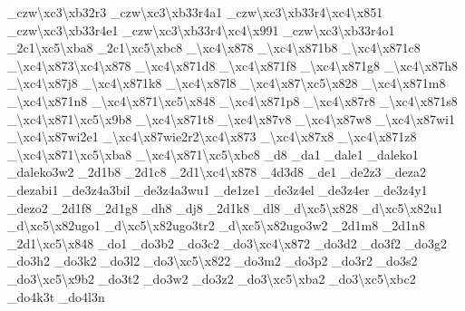 \begin{DoxyCompactItemize}
\-\_\-czw\textbackslash{}xc3\textbackslash{}xb32r3 \-\_\-czw\textbackslash{}xc3\textbackslash{}xb33r4a1 \-\_\-czw\textbackslash{}xc3\textbackslash{}xb33r4\textbackslash{}xc4\textbackslash{}x851 \-\_\-czw\textbackslash{}xc3\textbackslash{}xb33r4e1 \-\_\-czw\textbackslash{}xc3\textbackslash{}xb33r4\textbackslash{}xc4\textbackslash{}x991 \-\_\-czw\textbackslash{}xc3\textbackslash{}xb33r4o1 \-\_\-2c1\textbackslash{}xc5\textbackslash{}xba8 \-\_\-2c1\textbackslash{}xc5\textbackslash{}xbc8 \-\_\-\textbackslash{}xc4\textbackslash{}x878 \-\_\textbackslash{}xc4\textbackslash{}x871b8 \-\_\textbackslash{}xc4\textbackslash{}x871c8 \-\_\textbackslash{}xc4\textbackslash{}x873\textbackslash{}xc4\textbackslash{}x878 \-\_\textbackslash{}xc4\textbackslash{}x871d8 \-\_\textbackslash{}xc4\textbackslash{}x871f8 \-\_\textbackslash{}xc4\textbackslash{}x871g8 \-\_\-\textbackslash{}xc4\textbackslash{}x87h8 \-\_\-\textbackslash{}xc4\textbackslash{}x87j8 \-\_\textbackslash{}xc4\textbackslash{}x871k8 \-\_\-\textbackslash{}xc4\textbackslash{}x87l8 \-\_\-\textbackslash{}xc4\textbackslash{}x87\textbackslash{}xc5\textbackslash{}x828 \-\_\textbackslash{}xc4\textbackslash{}x871m8 \-\_\textbackslash{}xc4\textbackslash{}x871n8 \-\_\textbackslash{}xc4\textbackslash{}x871\textbackslash{}xc5\textbackslash{}x848 \-\_\textbackslash{}xc4\textbackslash{}x871p8 \-\_\-\textbackslash{}xc4\textbackslash{}x87r8 \-\_\textbackslash{}xc4\textbackslash{}x871s8 \-\_\textbackslash{}xc4\textbackslash{}x871\textbackslash{}xc5\textbackslash{}x9b8 \-\_\textbackslash{}xc4\textbackslash{}x871t8 \-\_\-\textbackslash{}xc4\textbackslash{}x87v8 \-\_\-\textbackslash{}xc4\textbackslash{}x87w8 \-\_\-\textbackslash{}xc4\textbackslash{}x87wi1 \-\_\-\textbackslash{}xc4\textbackslash{}x87wi2e1 \-\_\-\textbackslash{}xc4\textbackslash{}x87wie2r2\textbackslash{}xc4\textbackslash{}x873 \-\_\-\textbackslash{}xc4\textbackslash{}x87x8 \-\_\textbackslash{}xc4\textbackslash{}x871z8 \-\_\textbackslash{}xc4\textbackslash{}x871\textbackslash{}xc5\textbackslash{}xba8 \-\_\textbackslash{}xc4\textbackslash{}x871\textbackslash{}xc5\textbackslash{}xbc8 \-\_\-d8 \-\_\-da1 \-\_\-dale1 \-\_\-daleko1 \-\_\-daleko3w2 \-\_\-2d1b8 \-\_\-2d1c8 \-\_\-2d1\textbackslash{}xc4\textbackslash{}x878 \-\_\-4d3d8 \-\_\-de1 \-\_\-de2z3 \-\_\-deza2 \-\_\-dezabi1 \-\_\-de3z4a3bil \-\_\-de3z4a3wu1 \-\_\-de1ze1 \-\_\-de3z4el \-\_\-de3z4er \-\_\-de3z4y1 \-\_\-dezo2 \-\_\-2d1f8 \-\_\-2d1g8 \-\_\-dh8 \-\_\-dj8 \-\_\-2d1k8 \-\_\-dl8 \-\_\-d\textbackslash{}xc5\textbackslash{}x828 \-\_\-d\textbackslash{}xc5\textbackslash{}x82u1 \-\_\-d\textbackslash{}xc5\textbackslash{}x82ugo1 \-\_\-d\textbackslash{}xc5\textbackslash{}x82ugo3tr2 \-\_\-d\textbackslash{}xc5\textbackslash{}x82ugo3w2 \-\_\-2d1m8 \-\_\-2d1n8 \-\_\-2d1\textbackslash{}xc5\textbackslash{}x848 \-\_\-do1 \-\_\-do3b2 \-\_\-do3c2 \-\_\-do3\textbackslash{}xc4\textbackslash{}x872 \-\_\-do3d2 \-\_\-do3f2 \-\_\-do3g2 \-\_\-do3h2 \-\_\-do3k2 \-\_\-do3l2 \-\_\-do3\textbackslash{}xc5\textbackslash{}x822 \-\_\-do3m2 \-\_\-do3p2 \-\_\-do3r2 \-\_\-do3s2 \-\_\-do3\textbackslash{}xc5\textbackslash{}x9b2 \-\_\-do3t2 \-\_\-do3w2 \-\_\-do3z2 \-\_\-do3\textbackslash{}xc5\textbackslash{}xba2 \-\_\-do3\textbackslash{}xc5\textbackslash{}xbc2 \-\_\-do4k3t \-\_\-do4l3n 
\end{DoxyCompactItemize}
